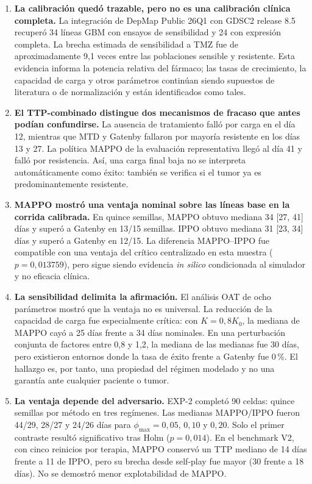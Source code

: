 \begin{enumerate}
  \item \textbf{La calibración quedó trazable, pero no es una calibración clínica completa.} La integración de DepMap Public 26Q1 con GDSC2 release 8.5 recuperó 34 líneas GBM con ensayos de sensibilidad y 24 con expresión completa. La brecha estimada de sensibilidad a TMZ fue de aproximadamente 9,1 veces entre las poblaciones sensible y resistente. Esta evidencia informa la potencia relativa del fármaco; las tasas de crecimiento, la capacidad de carga y otros parámetros continúan siendo supuestos de literatura o de normalización y están identificados como tales.

  \item \textbf{El TTP-combinado distingue dos mecanismos de fracaso que antes podían confundirse.} La ausencia de tratamiento falló por carga en el día 12, mientras que MTD y Gatenby fallaron por mayoría resistente en los días 13 y 27. La política MAPPO de la evaluación representativa llegó al día 41 y falló por resistencia. Así, una carga final baja no se interpreta automáticamente como éxito: también se verifica si el tumor ya es predominantemente resistente.

  \item \textbf{MAPPO mostró una ventaja nominal sobre las líneas base en la corrida calibrada.} En quince semillas, MAPPO obtuvo mediana 34 [27, 41] días y superó a Gatenby en 13/15 semillas. IPPO obtuvo mediana 31 [23, 34] días y superó a Gatenby en 12/15. La diferencia MAPPO--IPPO fue compatible con una ventaja del crítico centralizado en esta muestra ($p=0{,}013759$), pero sigue siendo evidencia \emph{in silico} condicionada al simulador y no eficacia clínica.

  \item \textbf{La sensibilidad delimita la afirmación.} El análisis OAT de ocho parámetros mostró que la ventaja no es universal. La reducción de la capacidad de carga fue especialmente crítica: con $K=0{,}8K_0$, la mediana de MAPPO cayó a 25 días frente a 34 días nominales. En una perturbación conjunta de factores entre 0,8 y 1,2, la mediana de las medianas fue 30 días, pero existieron entornos donde la tasa de éxito frente a Gatenby fue 0\,\%. El hallazgo es, por tanto, una propiedad del régimen modelado y no una garantía ante cualquier paciente o tumor.

  \item \textbf{La ventaja depende del adversario.} EXP-2 completó 90 celdas: quince semillas por método en tres regímenes. Las medianas MAPPO/IPPO fueron 44/29, 28/27 y 24/26 días para $\phi_{\max}=0{,}05$, $0{,}10$ y $0{,}20$. Solo el primer contraste resultó significativo tras Holm ($p=0{,}014$). En el benchmark V2, con cinco reinicios por terapia, MAPPO conservó un TTP mediano de 14 días frente a 11 de IPPO, pero su brecha desde self-play fue mayor (30 frente a 18 días). No se demostró menor explotabilidad de MAPPO.


\end{enumerate}
